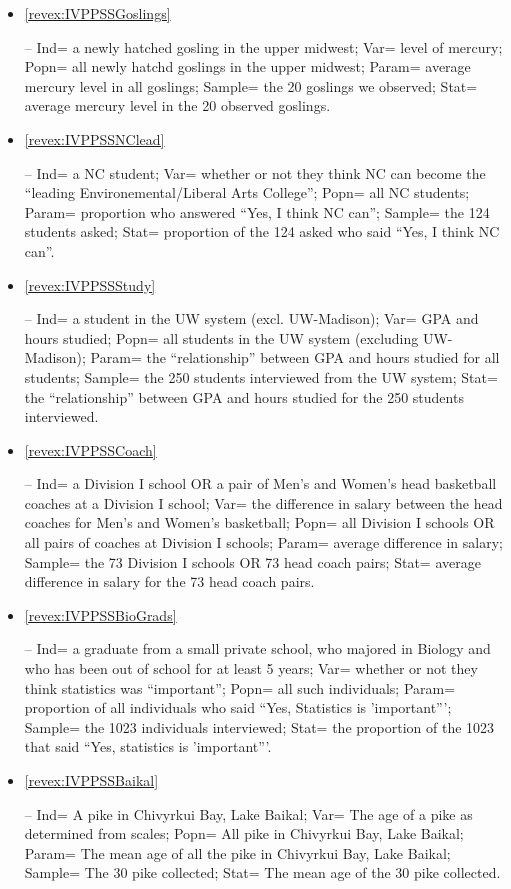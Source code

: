 \documentclass[10pt,openany]{book}\usepackage[]{graphicx}\usepackage[]{color}
\begin{document}
\begin{itemize}
  \item \hypertarget{ans:IVPPSSGoslings}{\ref{revex:IVPPSSGoslings}} -- Ind= a newly hatched gosling in the upper midwest; Var= level of mercury; Popn= all newly hatchd goslings in the upper midwest; Param= average mercury level in all goslings; Sample= the 20 goslings we observed; Stat= average mercury level in the 20 observed goslings.

  \item \hypertarget{ans:IVPPSSNClead}{\ref{revex:IVPPSSNClead}} -- Ind= a NC student; Var= whether or not they think NC can become the ``leading Environemental/Liberal Arts College''; Popn= all NC students; Param= proportion who answered ``Yes, I think NC can''; Sample= the 124 students asked; Stat= proportion of the 124 asked who said ``Yes, I think NC can''.

  \item \hypertarget{ans:IVPPSSStudy}{\ref{revex:IVPPSSStudy}} -- Ind= a student in the UW system (excl. UW-Madison); Var= GPA and hours studied; Popn= all students in the UW system (excluding UW-Madison); Param= the ``relationship'' between GPA and hours studied for all students; Sample= the 250 students interviewed from the UW system; Stat= the ``relationship'' between GPA and hours studied for the 250 students interviewed.

  \item \hypertarget{ans:IVPPSSCoach}{\ref{revex:IVPPSSCoach}} -- Ind= a Division I school OR a pair of Men's and Women's head basketball coaches at a Division I school; Var= the difference in salary between the head coaches for Men's and Women's basketball; Popn= all Division I schools OR all pairs of coaches at Division I schools; Param= average difference in salary; Sample= the 73 Division I schools OR 73 head coach pairs; Stat= average difference in salary for the 73 head coach pairs.

  \item \hypertarget{ans:IVPPSSBioGrads}{\ref{revex:IVPPSSBioGrads}} -- Ind= a graduate from a small private school, who majored in Biology and who has been out of school for at least 5 years; Var= whether or not they think statistics was ``important''; Popn= all such individuals; Param= proportion of all individuals who said ``Yes, Statistics is 'important'''; Sample= the 1023 individuals interviewed; Stat= the proportion of the 1023 that said ``Yes, statistics is 'important'''.

  \item \hypertarget{ans:IVPPSSBaikal}{\ref{revex:IVPPSSBaikal}} -- Ind= A pike in Chivyrkui Bay, Lake Baikal; Var= The age of a pike as determined from scales; Popn= All pike in Chivyrkui Bay, Lake Baikal; Param= The mean age of all the pike in Chivyrkui Bay, Lake Baikal; Sample= The 30 pike collected; Stat= The mean age of the 30 pike collected.


\end{itemize}
\end{document}
